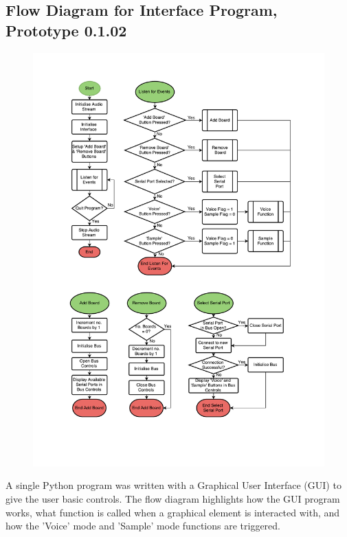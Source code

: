 \subsection{Flow Diagram for Interface Program, Prototype 0.1.02}
\label{pyblue_flow}
\begin{figure}[H]
\centering
\includegraphics[scale = 0.6]{Images/PyFlow}
\end{figure}
A single Python program was written with a Graphical User Interface (GUI) to give the user basic controls. The flow diagram highlights how the GUI program works, what function is called when a graphical element is interacted with, and how the 'Voice' mode and 'Sample' mode functions are triggered. 



